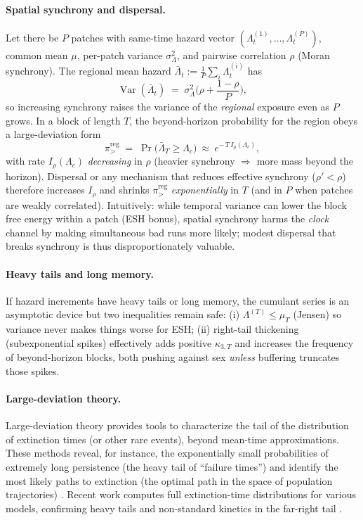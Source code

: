 \documentclass[11pt]{article}
\theoremstyle{upright}
\newcommand{\Var}{\operatorname{Var}}
\newcommand{\hazT}[1]{\Lambda^{(#1)}}          %
\begin{document}
\paragraph{Spatial synchrony and dispersal.}
Let there be $P$ patches with same-time hazard vector $(\Lambda_t^{(1)},\dots,\Lambda_t^{(P)})$,
common mean $\mu$, per-patch variance $\sigma_\Lambda^2$, and pairwise correlation $\rho$ (Moran
synchrony). The regional mean hazard $\bar\Lambda_t:=\tfrac{1}{P}\sum_i \Lambda_t^{(i)}$ has
\[
\Var(\bar\Lambda_t)\;=\;\sigma_\Lambda^2\Big(\rho+\frac{1-\rho}{P}\Big),
\]
so increasing synchrony raises the variance of the \emph{regional} exposure even as $P$ grows. In a
block of length $T$, the beyond-horizon probability for the region obeys a large-deviation form
\[
\pi_{>}^{\mathrm{reg}} \;=\; \Pr\!\big(\bar\Lambda_T\ge \Lambda_c\big)\ \approx\ e^{-\,T\,I_\rho(\Lambda_c)},
\]
with rate $I_\rho(\Lambda_c)$ \emph{decreasing} in $\rho$ (heavier synchrony $\Rightarrow$ more mass
beyond the horizon). Dispersal or any mechanism that reduces effective synchrony ($\rho'\!<\rho$)
therefore increases $I_\rho$ and shrinks $\pi_{>}^{\mathrm{reg}}$ \emph{exponentially} in $T$ (and in $P$
when patches are weakly correlated). Intuitively: while temporal variance can lower the block free
energy within a patch (ESH bonus), spatial synchrony harms the \emph{clock} channel by making
simultaneous bad runs more likely; modest dispersal that breaks synchrony is thus disproportionately
valuable.

\paragraph{Heavy tails and long memory.}
If hazard increments have heavy tails or long memory, the cumulant series is an asymptotic device but two inequalities remain safe: (i) $\hazT{T}\le \mu_T$ (Jensen) so variance never makes things worse for ESH; (ii) right-tail thickening (subexponential spikes) effectively adds positive $\kappa_{3,T}$ and increases the frequency of beyond-horizon blocks, both pushing against sex \emph{unless} buffering truncates those spikes.

\paragraph{Large-deviation theory.}
Large-deviation theory provides tools to characterize the tail of the distribution of extinction times (or other rare events), beyond mean-time approximations. These methods reveal, for instance, the exponentially small probabilities of extremely long persistence (the heavy tail of “failure times”) and identify the most likely paths to extinction (the optimal path in the space of population trajectories) \citep{Ovaskainen2010}. Recent work computes full extinction-time distributions for various models, confirming heavy tails and non-standard kinetics in the far-right tail \citep{Kessler2023}.
\end{document}

